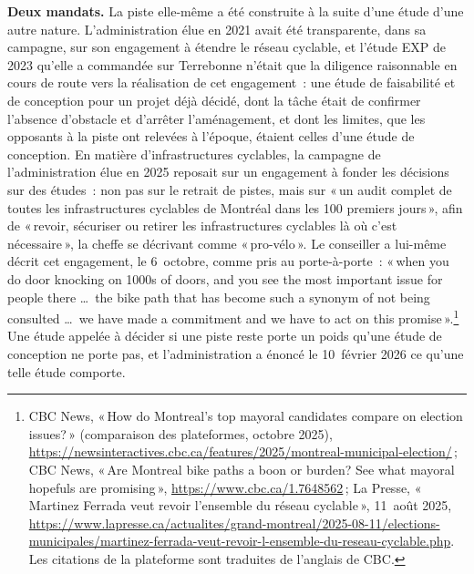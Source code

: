 \documentclass[11pt,letterpaper]{article}
\begin{document}
\textbf{Deux mandats.} La piste elle-même a été construite à la suite
d'une étude d'une autre nature. L'administration élue en 2021 avait été
transparente, dans sa campagne, sur son engagement à étendre le réseau
cyclable, et l'étude EXP de 2023 qu'elle a commandée sur Terrebonne n'était
que la diligence raisonnable en cours de route vers la réalisation de cet
engagement~: une étude de faisabilité et de conception pour un projet déjà
décidé, dont la tâche était de confirmer l'absence d'obstacle et d'arrêter
l'aménagement, et dont les limites, que les opposants à la piste ont
relevées à l'époque, étaient celles d'une étude de conception. En matière
d'infrastructures cyclables, la campagne de l'administration élue en 2025
reposait sur un engagement à fonder les décisions sur des études~: non pas
sur le retrait de pistes, mais sur «\,un audit complet de
toutes les infrastructures cyclables de Montréal dans les 100 premiers
jours\,», afin de «\,revoir, sécuriser ou retirer les infrastructures
cyclables là où c'est nécessaire\,», la cheffe se décrivant comme
«\,pro-vélo\,». Le conseiller a lui-même décrit cet engagement, le
6~octobre, comme pris au porte-à-porte~: «\,when you do door knocking on
1000s of doors, and you see the most important issue for people there
\ldots\ the bike path that has become such a synonym of not being
consulted \ldots\ we have made a commitment and we have to act on this
promise\,».\footnote{CBC News, «\,How do Montreal's top mayoral
candidates compare on election issues?\,» (comparaison des plateformes,
octobre 2025),
\url{https://newsinteractives.cbc.ca/features/2025/montreal-municipal-election/}\,;
CBC News, «\,Are Montreal bike paths a boon or burden? See what mayoral
hopefuls are promising\,», \url{https://www.cbc.ca/1.7648562}\,; La
Presse, «\,Martinez Ferrada veut revoir l'ensemble du réseau
cyclable\,», 11~août 2025,
\url{https://www.lapresse.ca/actualites/grand-montreal/2025-08-11/elections-municipales/martinez-ferrada-veut-revoir-l-ensemble-du-reseau-cyclable.php}.
Les citations de la plateforme sont traduites de l'anglais de CBC.} Une
étude appelée à décider si une piste reste porte un poids qu'une étude de
conception ne porte pas, et l'administration a énoncé le 10~février 2026
ce qu'une telle étude comporte.
\end{document}

